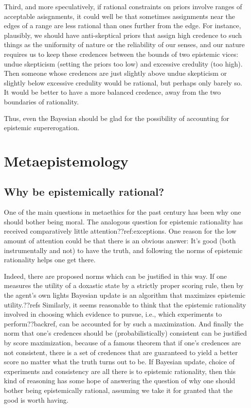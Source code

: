 Third, and more speculatively, if rational constraints on priors involve ranges of acceptable asisgnments, it could well be that 
sometimes assignments near the edges of a range are less rational than ones further from the edge. For instance, plausibly, we 
should have anti-skeptical priors that assign high credence to such things as the uniformity of nature or the reliability of 
our senses, and our nature requires us to keep these credences between the bounds of two epistemic vices: undue skepticism (setting 
the priors too low) and excessive credulity (too high). Then someone whose credences are just slightly above undue skepticism 
or slightly below excessive credulity would be rational, but perhaps only barely so. It would be better to have a more balanced
credence, away from the two boundaries of rationality.

Thus, even the Bayesian should be glad for the possibility of accounting for epistemic supererogation.

\section{Metaepistemology}
\subsection{Why be epistemically rational?}
One of the main questions in metaethics for the past century has been why one should bother being moral. The analogous
question for epistemic rationality has received comparatively little attention??ref:exceptions.
One reason for the low amount of attention could be that there is an obvious answer: It's good 
(both instrumentally and not) to have the truth, and following the norms of epistemic rationality 
helps one get there.

Indeed, there are proposed norms which can be justified in this way. If one measures the utility of a 
doxastic state by a strictly proper scoring rule, then by the agent's own lights Bayesian update is 
an algorithm that maximizes epistemic utility.??refs Similarly, it seems reasonable to think that the
epistemic rationality involved in choosing which evidence to pursue, i.e., which experiments to perform??backref, 
can be accounted for by such a maximization. And finally the norm that one's credences should be 
(probabilistically) consistent can be justified by score maximization, because of a famous theorem
that if one's credences are not consistent, there is a set of credences that are guaranteed to yield 
a better score no matter what the truth turns out to be. If Bayesian update, choice of experiments and consistency
are all there is to  epistemic rationality, then this kind of reasoning has some hope of answering the question 
of why one should bother being epistemically rational, assuming we take it for granted that the good is worth
having. 

